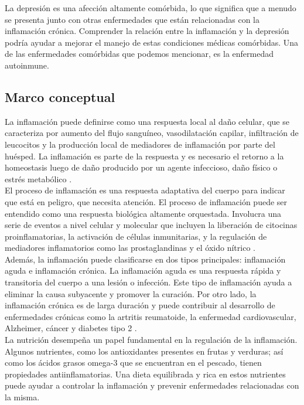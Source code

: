 \documentclass[jou]{apa7}
\begin{document}
	La depresión es una afección altamente comórbida, lo que significa que a
	menudo se presenta junto con otras enfermedades que están relacionadas
	con la inflamación crónica. Comprender la relación entre la inflamación
	y la depresión podría ayudar a mejorar el manejo de estas condiciones
	médicas comórbidas. Una de las enfermedades comórbidas que podemos
	mencionar, es la enfermedad autoinmune. \parencite{Bloch1983}
	
	\subsection{Marco conceptual}
	La inflamación puede definirse como una respuesta local al daño celular,
	que se caracteriza por aumento del flujo sanguíneo, vasodilatación
	capilar, infiltración de leucocitos y la producción local de mediadores
	de inflamación por parte del huésped. La inflamación es parte de la
	respuesta y es necesario el retorno a la homeostasis luego de daño
	producido por un agente infeccioso, daño físico o estrés metabólico
	\parencite{GarciaCasal2014}.\\
	
	El proceso de inflamación es una respuesta adaptativa del cuerpo para
	indicar que está en peligro, que necesita atención. El proceso de
	inflamación puede ser entendido como una respuesta biológica altamente
	orquestada. Involucra una serie de eventos a nivel celular y molecular
	que incluyen la liberación de citocinas proinflamatorias, la activación
	de células inmunitarias, y la regulación de mediadores inflamatorios
	como las prostaglandinas y el óxido nítrico \parencite{Stankov2012}.\\
	
	Además, la inflamación puede clasificarse en dos tipos principales:
	inflamación aguda e inflamación crónica. La inflamación aguda es una
	respuesta rápida y transitoria del cuerpo a una lesión o infección. Este
	tipo de inflamación ayuda a eliminar la causa subyacente y promover la
	curación. Por otro lado, la inflamación crónica es de larga duración y
	puede contribuir al desarrollo de enfermedades crónicas como la artritis
	reumatoide, la enfermedad cardiovascular, Alzheimer, cáncer y diabetes
	tipo 2 \parencite{Osimo2019}.\\
	
	La nutrición desempeña un papel fundamental en la regulación de la
	inflamación. Algunos nutrientes, como los antioxidantes presentes en
	frutas y verduras; así como los ácidos grasos omega-3 que se encuentran
	en el pescado, tienen propiedades antiinflamatorias. Una dieta
	equilibrada y rica en estos nutrientes puede ayudar a controlar la
	inflamación y prevenir enfermedades relacionadas con la misma.
	
\end{document}
